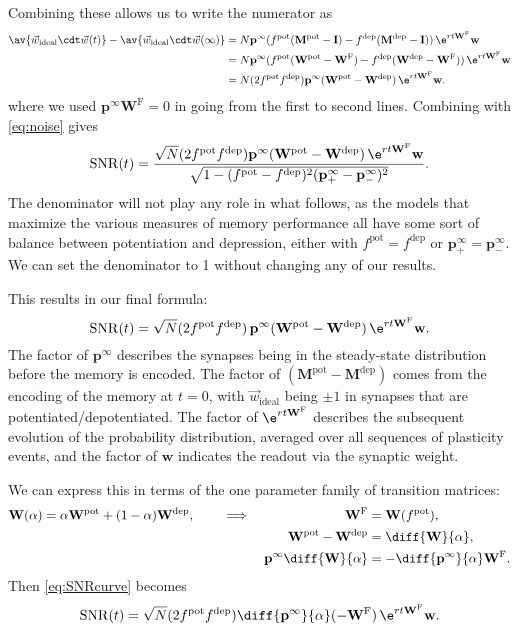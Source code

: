 \documentclass{article} %
\DeclareMathOperator{\SNR}{SNR}
\newcommand{\wv}{\vec{w}}
\newcommand{\wvi}{\vec{w}_\text{ideal}}
\newcommand{\I}{\mathbf{I}}
\newcommand{\pr}{\mathbf{p}}
\newcommand{\eq}{\pr^\infty}
\newcommand{\w}{\mathbf{w}}
\newcommand{\W}{\mathbf{W}}
\newcommand{\M}{\mathbf{M}}
\newcommand{\frg}{\W^{\mathrm{F}}}
\newcommand{\pot}{^{\text{pot}}}
\newcommand{\dep}{^{\text{dep}}}
\begin{document}
Combining these allows us to write the numerator as
%
\begin{equation}\label{eq:signal}
\begin{aligned}
  \av{\wv_\text{ideal}\cdt\wv(t)} - \av{\wv_\text{ideal}\cdt\wv(\infty)}
    &= N \eq (f\pot(\M\pot-\I)-f\dep(\M\dep-\I))\, \e^{rt\frg} \w \\
    &= N \eq (f\pot(\W\pot-\frg)-f\dep(\W\dep-\frg))\, \e^{rt\frg} \w \\
    &= N (2f\pot f\dep)\eq (\W\pot  - \W\dep )\,\e^{rt\frg}\w.
\end{aligned}
\end{equation}
%
where we used $\eq\frg=0$ in going from the first to second lines.
Combining with \eqref{eq:noise} gives
%
\begin{equation}\label{eq:SNRcurveExact}
  \SNR(t) = \frac{\sqrt{N} (2f\pot f\dep ) \eq (\W\pot  - \W\dep )\,\e^{rt\frg}\w}
                 {\sqrt{1-(f\pot-f\dep)^2(\eq_+-\eq_-)^2}}.
\end{equation}
%
The denominator will not play any role in what follows, as the models that maximize the various measures of memory performance all have some sort of balance between potentiation and depression, either with $f\pot=f\dep$ or $\eq_+=\eq_-$.
We can set the denominator to 1 without changing any of our results.

This results in our final formula:
%
\begin{equation}\label{eq:SNRcurve}
  \SNR(t) = \sqrt{N} (2f\pot f\dep )\, \eq (\W\pot  - \W\dep )\,\e^{rt\frg}\w.
\end{equation}
%
The factor of $\eq$ describes the synapses being in the steady-state distribution before the memory is encoded. The factor of $(\M\pot-\M\dep)$ comes from the encoding of the memory at $t=0$, with $\wvi$ being $\pm1$ in synapses that are potentiated/depotentiated. The factor of $\e^{rt\frg}$ describes the subsequent evolution of the probability distribution, averaged over all sequences of plasticity events, and the factor of $\w$ indicates the readout via the synaptic weight.

We can express this in terms of the one parameter family of transition matrices:
%
\begin{equation}\label{eq:Walpha}
  \begin{aligned}
  \W(\alpha) &= \alpha\W\pot +(1-\alpha)\W\dep ,
  &\quad&\implies&
    \frg&=\W(f\pot ),\\&&&&
    \W\pot  - \W\dep  &= \diff{\W}{\alpha},\\&&&&
    \eq \diff{\W}{\alpha} &= -\diff{\eq}{\alpha} \frg.
  \end{aligned}
\end{equation}
%
Then \eqref{eq:SNRcurve} becomes
%
\begin{equation}\label{eq:SNRalpha}
  \SNR(t) = \sqrt{N} (2f\pot f\dep ) \diff{\eq}{\alpha}(-\frg)\,\e^{rt\frg}\w.
\end{equation}
%
\end{document}
